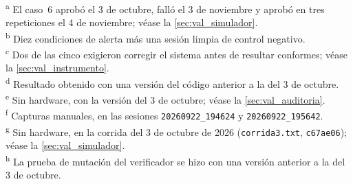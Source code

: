 \begin{table}[H]
  \vspace{0.5em}
  \begin{minipage}{0.92\textwidth}
    \footnotesize
    \textsuperscript{a} El caso~6 aprobó el 3 de octubre, falló el 3 de
    noviembre y aprobó en tres repeticiones el 4 de noviembre; véase la
    \cref{sec:val_simulador}.\\
    \textsuperscript{b} Diez condiciones de alerta más una sesión limpia
    de control negativo.\\
    \textsuperscript{c} Dos de las cinco exigieron corregir el sistema
    antes de resultar conformes; véase la \cref{sec:val_instrumento}.\\
    \textsuperscript{d} Resultado obtenido con una versión del código
    anterior a la del 3 de octubre.\\
    \textsuperscript{e} Sin hardware, con la versión del 3 de octubre; véase la
    \cref{sec:val_auditoria}.\\
    \textsuperscript{f} Capturas manuales, en las sesiones
    \texttt{20260922\_194624} y \texttt{20260922\_195642}.\\
    \textsuperscript{g} Sin hardware, en la corrida del 3 de octubre de
    2026 (\texttt{corrida3.txt}, \texttt{c67ae06}); véase la
    \cref{sec:val_simulador}.\\
    \textsuperscript{h} La prueba de mutación del verificador se hizo con
    una versión anterior a la del 3 de octubre.
  \end{minipage}
\end{table}

